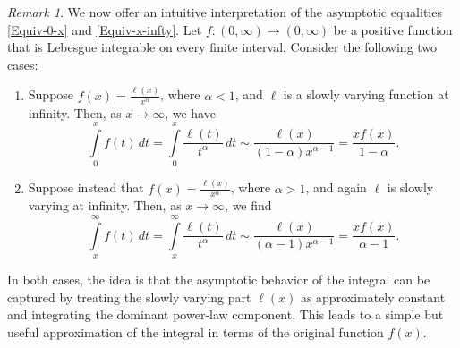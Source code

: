 \documentclass[12pt,reqno]{amsart}
\theoremstyle{plain}
\theoremstyle{definition}
\theoremstyle{remark}
\newtheorem{rem}[thm]{Remark}
\numberwithin{equation}{section}
\renewcommand{\L}{\ell}
\begin{document}
\begin{rem}
\rm We now offer an intuitive interpretation of the asymptotic equalities \eqref{Equiv-0-x} and \eqref{Equiv-x-infty}. Let $ f \colon (0, \infty) \to (0, \infty) $ be a positive function that is Lebesgue integrable on every finite interval. Consider the following two cases:
\begin{enumerate}[label=(\roman*)]
    \item Suppose $ f(x) = \frac{\L(x)}{x^\alpha} $, where $ \alpha < 1 $, and $ \L $ is a slowly varying function at infinity. Then, as $ x \to \infty $, we have
    \begin{equation}
        \label{Equiv-0-xx}
        \int\limits_0^x f(t) \, dt = \int\limits_0^x \frac{\L(t)}{t^\alpha} \, dt \sim  \frac{\L(x)}{(1 - \alpha)x^{\alpha - 1}} = \frac{x f(x)}{1 - \alpha}.
    \end{equation}
    \item Suppose instead that $ f(x) = \frac{\L(x)}{x^\alpha} $, where $ \alpha > 1 $, and again $ \L $ is slowly varying at infinity. Then, as $ x \to \infty $, we find
    \begin{equation}
        \label{Equiv-xx-infty}
        \int\limits_x^\infty f(t) \, dt = \int\limits_x^\infty \frac{\L(t)}{t^\alpha} \, dt \sim  \frac{\L(x)}{(\alpha - 1)x^{\alpha - 1}} = \frac{x f(x)}{\alpha - 1}.
    \end{equation}
\end{enumerate}

In both cases, the idea is that the asymptotic behavior of the integral can be captured by treating the slowly varying part $ \L(x) $ as approximately constant and integrating the dominant power-law component. This leads to a simple but useful approximation of the integral in terms of the original function $ f(x) $.
\end{rem}
\end{document}

